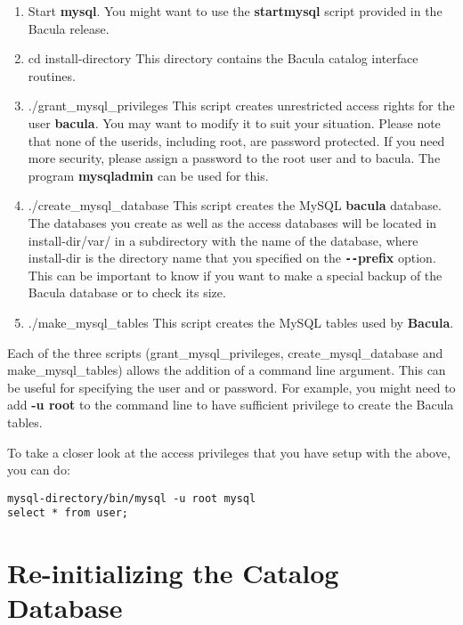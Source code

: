 \begin{enumerate}
\item Start {\bf mysql}. You might want to use the {\bf startmysql}  script
   provided in the Bacula release.  

\item cd \lt{}install-directory\gt{}
   This directory contains the Bacula catalog  interface routines.  

\item ./grant\_mysql\_privileges
   This script creates unrestricted access rights for the user {\bf bacula}. 
   You may  want to modify it to suit your situation. Please
   note that none of the userids, including root, are password protected.  
   If you need more security, please assign a password to the root user
   and to bacula. The program {\bf mysqladmin} can be used for this.

\item ./create\_mysql\_database
   This script creates the MySQL {\bf bacula} database.  The databases you
   create as well as the access databases will be located in
   \lt{}install-dir\gt{}/var/ in a subdirectory with the name of the
   database, where \lt{}install-dir\gt{} is the directory name that you
   specified on the {\bf \verb:--:prefix} option.  This can be important to
   know if you want to make a special backup of the Bacula database or to
   check its size.

\item ./make\_mysql\_tables
   This script creates the MySQL tables used by {\bf Bacula}. 
\end{enumerate}

Each of the three scripts (grant\_mysql\_privileges, create\_mysql\_database
and make\_mysql\_tables) allows the addition of a command line argument. This
can be useful for specifying the user and or password. For example, you might
need to add {\bf -u root} to the command line to have sufficient privilege to
create the Bacula tables. 

To take a closer look at the access privileges that you have setup with the
above, you can do: 

\footnotesize
\begin{verbatim}
mysql-directory/bin/mysql -u root mysql
select * from user;
\end{verbatim}
\normalsize

\section{Re-initializing the Catalog Database}

